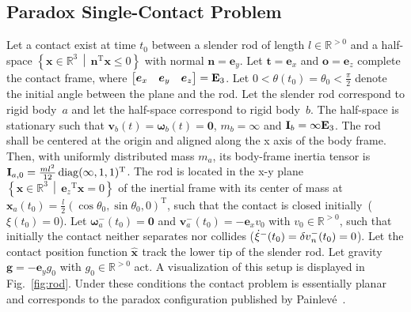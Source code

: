\documentclass[global,twocolumn]{svjour}
\let\vec\bm
\newcommand{\vectoscalar}[1]{{\renewcommand{\vec}{}#1}}
\newcommand{\setprop}[2]{\ensuremath{\left\{ #1 \,\middle|\, #2 \right\}}}
\newcommand{\mat}[1]{{\bf #1}}
\newcommand{\R}{\mathbb{R}}
\newcommand{\transp}{{\mathrm{T}}}
\newcommand{\pos}    [1]{\ensuremath{\vec{x}_{#1}}}
\newcommand{\linvel} [1]{\ensuremath{\vec{v}_{#1}}}
\newcommand{\angvel} [1]{\ensuremath{\vec{\omega}_{#1}}}
\newcommand{\prelinvel} [1]{\ensuremath{\vec{v}_{#1}^-}}
\newcommand{\preangvel} [1]{\ensuremath{\vec{\omega}_{#1}^-}}
\newcommand{\mass}   [1]{\ensuremath{m_{#1}}}
\newcommand{\inertia}[1]{\ensuremath{\mat{I}_{#1}}}
\newcommand{\identmat}[1]{\ensuremath{\mat{E}_{#1}}}
\newcommand{\unitvec}[1]{\ensuremath{\vec{e}_{#1}}}
\newcommand{\prerelvel}[1]{\ensuremath{{\vec{\delta v}_{#1}^-}}}
\newcommand{\prerelvelCFn}[1]{\ensuremath{\vectoscalar{\prerelvel{\ifstrequal{#1}{}{n}{#1,n}}}}}
\newcommand{\contactpos}    [1]{\ensuremath{\vec{\hat{x}}_{#1}}}
\newcommand{\diag}{\operatornamewithlimits{diag}}
\begin{document}
	\subsection{Paradox Single-Contact Problem}
	\label{sec:paradox}

	\begin{figure}
	\end{figure}

	Let a contact exist at time $t_0$ between a slender rod of length $l \in \R^{>0}$ and a half-space $\setprop{\vec x \in \R^3}{\vec n^\transp \vec x \leq 0}$ with normal $\vec n = \unitvec{y}$. Let $\vec t = \unitvec{x}$ and $\vec o = \unitvec{z}$ complete the contact frame, where $\begin{bmatrix} \unitvec{x} & \unitvec{y} & \unitvec{z} \end{bmatrix} = \identmat{3}$.
	Let $0 < \theta(t_0) = \theta_0 < \frac{\pi}{2}$ denote the initial angle between the plane and the rod. Let the slender rod correspond to rigid body~$a$ and let the half-space correspond to rigid body~$b$.
	The half-space is stationary such that $\linvel{b}(t) = \angvel{b}(t) = \vec 0$, $\mass{b} = \infty$ and $\inertia{b} = \infty \identmat{3}$.
	The rod shall be centered at the origin and aligned along the x axis of the body frame.
	Then, with uniformly distributed mass $\mass{a}$, its body-frame inertia tensor is $\inertia{a,0} = \frac{m l^2}{12} \diag (\infty, 1, 1)^\transp$.
	The rod is located in the x-y plane $\setprop{\vec x \in \R^3}{\unitvec{z}^\transp \vec x = 0}$ of the inertial frame with
	its center of mass at $\pos{a}(t_0) = \frac{l}{2} (\cos \theta_0, \sin \theta_0, 0)^\transp$, such that
	the contact is closed initially~($\xi(t_0) = 0$). Let $\preangvel{a}(t_0) = \vec 0$
	and $\prelinvel{a}(t_0) = -\unitvec{x}v_0$ with $v_0 \in \R^{>0}$, such that initially
	the contact neither separates nor collides ($\dot{\xi}^-(t_0) = \prerelvelCFn{}(t_0) = 0$).
	Let the contact position function $\contactpos{}$ track the lower tip of the slender rod.
	Let gravity $\vec g = -\unitvec{y} g_0$ with $g_0 \in \R^{>0}$ act. A visualization of this setup is displayed in Fig.~\ref{fig:rod}.
	Under these conditions the contact problem is essentially planar and corresponds to the paradox configuration
	published by Painlev\'{e}~\cite{painleve1895,stewart00}.
\end{document}
